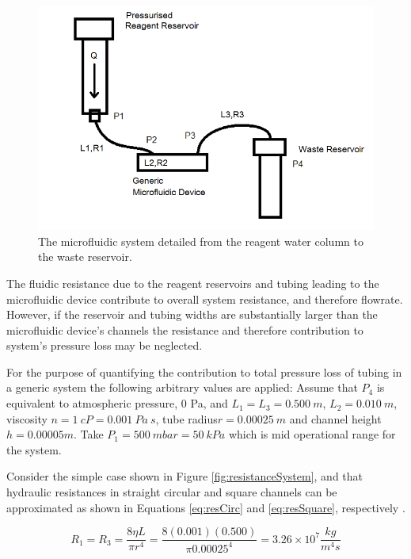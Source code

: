 \begin{figure}[H]
\centering 
\includegraphics[width=01.0\columnwidth]{resistanceSystem.PNG} 
\caption[Hydraulic Resistance of System]{The microfluidic system detailed from the reagent water column to the waste reservoir.} %
\label{fig:resistanceSystem} 
\end{figure}

The fluidic resistance due to the reagent reservoirs and tubing leading to the microfluidic device contribute to overall system resistance, and therefore flowrate. However, if the reservoir and tubing widths are substantially larger than the microfluidic device's channels the resistance and therefore contribution to system's pressure loss may be neglected.

For the purpose of quantifying the contribution to total pressure loss of tubing in a generic system the following arbitrary values are applied: Assume that $P_4$ is equivalent to atmospheric pressure, 0 Pa, and $L_1=L_3= 0.500 \ m$, $L_2=0.010 \ m$, viscosity $n=1 \ cP = 0.001 \ Pa \ s$, tube radius$r=0.00025 \ m$ and channel height $h=0.00005m$. Take $P_1 = 500 \ mbar = 50 \ kPa$ which is mid operational range for the system.

Consider the simple case shown in Figure \vref{fig:resistanceSystem}, and that hydraulic resistances in straight circular and square channels can be approximated as shown in Equations \vref{eq:resCirc} and \vref{eq:resSquare}, respectively \cite{Bruus2008}.

\begin{equation}
R_1 = R_3 = \frac{8 \eta L}{\pi r^4}= \frac{8 (0.001) (0.500)}{\pi 0.00025^4} = 3.26  \times 10^7 \frac{kg}{m^4s}
\label{eq:resCirc}
\end{equation}

